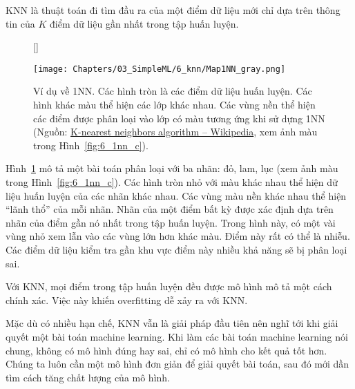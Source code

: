 KNN là thuật toán đi tìm đầu ra của một điểm dữ liệu mới chỉ dựa trên thông tin của $K$ điểm dữ liệu gần nhất trong tập
huấn luyện. 
\begin{figure}[t]
    [\FBwidth]
    {\caption{ 
    Ví dụ về 1NN. Các hình tròn là các điểm dữ liệu huấn luyện. Các hình khác
    màu thể hiện các lớp khác nhau. Các vùng nền thể hiện các điểm được phân
    loại vào lớp có màu tương ứng khi sử dựng 1NN (Nguồn:
    \href{https://en.wikipedia.org/wiki/K-nearest_neighbors_algorithm}{K-nearest
    neighbors algorithm  --  Wikipedia}, xem ảnh màu trong Hình~\ref{fig:6_1nn_c}).
    }
    \label{fig:6_1nn}}
    { %
    \texttt{[image: Chapters/03\_SimpleML/6\_knn/Map1NN\_gray.png]}
    }
\end{figure}


Hình~\ref{fig:6_1nn} mô tả một bài toán phân loại với ba nhãn: đỏ, lam, lục (xem ảnh màu trong Hình~\ref{fig:6_1nn_c}). Các
hình tròn nhỏ với màu khác nhau thể hiện dữ liệu huấn luyện của các nhãn khác
nhau. Các vùng màu nền khác nhau thể hiện ``lãnh thổ'' của mỗi nhãn. Nhãn của một điểm bất kỳ được xác định dựa trên nhãn của điểm gần nó nhất
trong tập huấn luyện. Trong hình này, có một vài vùng nhỏ xem lẫn vào các
vùng lớn hơn khác màu. Điểm này rất có thể là nhiễu. Các điểm dữ liệu kiểm tra gần khu vực điểm này nhiều khả năng sẽ bị phân loại sai.

Với KNN, mọi điểm trong tập
huấn luyện đều được mô hình mô tả một cách chính xác. Việc này khiến overfitting dễ xảy ra với KNN. 

Mặc dù có nhiều hạn chế, KNN vẫn là giải pháp đầu tiên nên nghĩ tới khi giải
quyết một bài toán machine learning. {Khi làm các bài toán machine
learning nói chung, không có mô hình đúng hay sai, chỉ có mô hình cho kết quả
tốt hơn. Chúng ta luôn cần một mô hình đơn giản để giải quyết bài toán, sau đó mới dần tìm cách tăng chất lượng của mô hình.}




